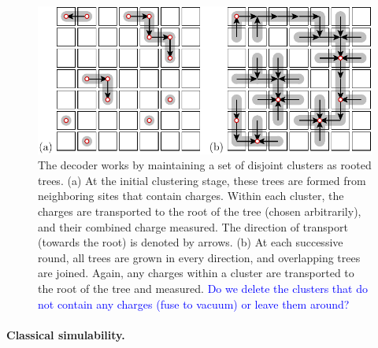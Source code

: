 \documentclass[aps, prl, letterpaper, twocolumn, superscriptaddress, notitlepage, 10pt]{revtex4-1}
\newcommand{\cggb}[1]{\textcolor{blue}{#1}}
\newcommand{\stf}[1]{\textcolor{green}{#1}}
\begin{document}
\begin{figure}[t!]
\begin{center}
	\includegraphics[width=1.0\columnwidth]{pic-decode.pdf}
\caption{The decoder works by maintaining a set of disjoint clusters as rooted trees.
(a) At the initial clustering stage, these trees are formed from neighboring sites that contain charges. Within each cluster, the charges are transported to the root of the tree (chosen arbitrarily), and their combined charge measured. The direction of transport (towards the root) is denoted by arrows.
(b) At each successive round, all trees are grown in every direction, and overlapping trees are joined. Again, any charges within a cluster are transported to the root of the tree and measured. \cggb{Do we delete the clusters that do not contain any charges (fuse to vacuum) or leave them around?}
}
\label{f:decode}
\end{center}
\end{figure}


\paragraph{Classical simulability.}
\end{document}
